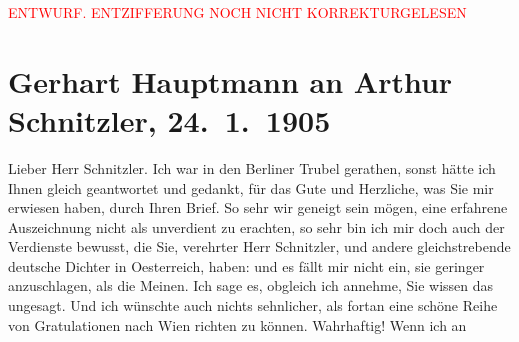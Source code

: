 
\begin{center}
            \textcolor{red}{ENTWURF. ENTZIFFERUNG NOCH NICHT KORREKTURGELESEN}
                      \end{center}
            
               \section[Gerhart Hauptmann an Arthur Schnitzler, 24. 1. 1905]{ Gerhart Hauptmann an Arthur Schnitzler, 24. 1. 1905}\nopagebreak{}\rehead{ }\begin{ledgroupsized}[t]{13cm}\normalsize\beginnumbering{} \toendnotes[C]{\smallbreak\pagebreak[2]} 
\toendnotes[C]{\smallbreak}\pstart{}{\pb}Lieber Herr Schnitzler.\pend\pstart
           Ich war in den Berliner Trubel gerathen, sonst
                    hätte ich Ihnen gleich geantwortet und gedankt, für das Gute und Herzliche, was
                    Sie mir erwiesen haben, durch Ihren Brief. So sehr wir geneigt sein mögen, eine
                    erfahrene Auszeichnung nicht als unverdient zu erachten, so sehr bin ich mir
                    doch auch der Verdienste bewusst, die Sie, verehrter Herr Schnitzler, und andere
                    gleichstrebende deutsche Dichter in Oesterreich, haben: und es fällt mir nicht ein, sie geringer
                    anzuschlagen, als die Meinen.\pend
           \pstart
           Ich sage es, obgleich ich {\pb}annehme, Sie wissen das ungesagt.
                    Und ich wünschte auch nichts sehnlicher, als fortan eine schöne Reihe von
                    Gratulationen nach Wien richten zu können.
                    Wahrhaftig! Wenn ich an \label{K_L01494_1v}
\end{ledgroupsized}

